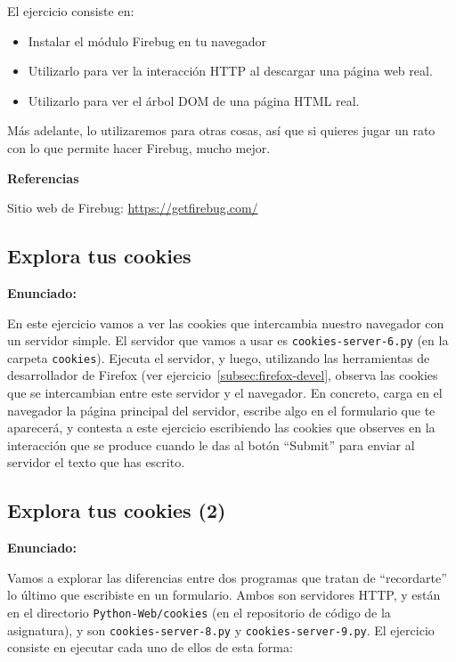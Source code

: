 El ejercicio consiste en:

\begin{itemize}
\item Instalar el módulo Firebug en tu navegador
\item Utilizarlo para ver la interacción HTTP al descargar una página web real.
\item Utilizarlo para ver el árbol DOM de una página HTML real.
\end{itemize}

Más adelante, lo utilizaremos para otras cosas, así que si quieres jugar un rato con lo que permite hacer Firebug, mucho mejor.

\textbf{Referencias}

Sitio web de Firebug: \url{https://getfirebug.com/}


\subsection{Explora tus cookies}
\label{subsec:explora-cookies}

\textbf{Enunciado:}

En este ejercicio vamos a ver las cookies que intercambia nuestro navegador con un servidor simple. El servidor que vamos a usar es \verb|cookies-server-6.py| (en la carpeta \verb|cookies|). Ejecuta el servidor, y luego, utilizando las herramientas de desarrollador de Firefox (ver ejercicio~\ref{subsec:firefox-devel}, observa las cookies que se intercambian entre este servidor y el navegador. En concreto, carga en el navegador la página principal del servidor, escribe algo en el formulario que te aparecerá, y contesta a este ejercicio escribiendo las cookies que observes en la interacción que se produce cuando le das al botón ``Submit'' para enviar al servidor el texto que has escrito.

\subsection{Explora tus cookies (2)}
\label{subsec:explora-cookies-2}

\textbf{Enunciado:}

Vamos a explorar las diferencias entre dos programas que tratan de ``recordarte''
lo último que escribiste en un formulario. Ambos son servidores HTTP, y están en el directorio \verb|Python-Web/cookies| (en el repositorio de código de la asignatura), y son \verb|cookies-server-8.py| y \verb|cookies-server-9.py|. El ejercicio consiste en ejecutar cada uno de ellos de esta forma:

